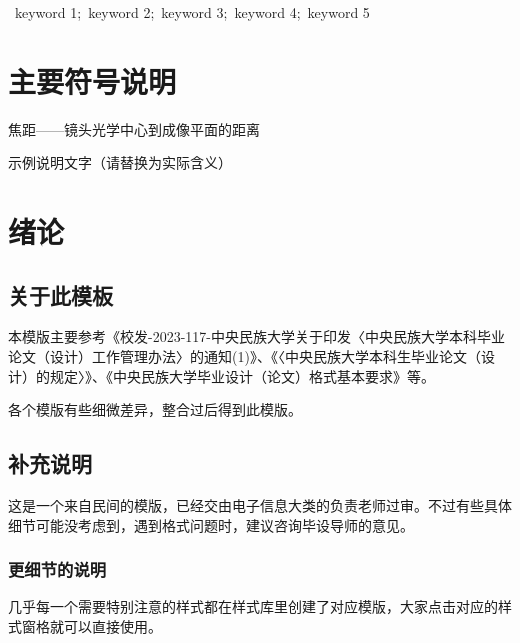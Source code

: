 \documentclass[12pt,a4paper]{ctexart}
\begin{document}
\vspace{1em}
~keyword 1;~keyword 2;~keyword 3;~keyword 4;~keyword 5

\fontfamily{\familydefault}\selectfont 

\newpage
\setcounter{page}{4}
\enlargethispage{\baselineskip}
\vspace*{-\topskip}
\tableofcontents
\thispagestyle{fancy}

\newpage
\listoffigures
\thispagestyle{fancy}

\newpage
\listoftables
\thispagestyle{fancy}

\newpage
\section*{主要符号说明}
\thispagestyle{fancy}
\begin{description}[leftmargin=4em,itemsep=0.5\baselineskip]
    \item[$f$] 焦距——镜头光学中心到成像平面的距离
    \item[$\delta$] 示例说明文字（请替换为实际含义）
\end{description}

\newpage
\setcounter{page}{1}
\section{绪论}
\subsection{关于此模板}
本模版主要参考《校发-2023-117-中央民族大学关于印发〈中央民族大学本科毕业论文（设计）工作管理办法〉的通知(1)》、《〈中央民族大学本科生毕业论文（设计）的规定〉》、《中央民族大学毕业设计（论文）格式基本要求》等。

各个模版有些细微差异，整合过后得到此模版。

\subsection{补充说明}
这是一个来自民间的模版，已经交由电子信息大类的负责老师过审。不过有些具体细节可能没考虑到，遇到格式问题时，建议咨询毕设导师的意见。
\subsubsection{更细节的说明}
几乎每一个需要特别注意的样式都在样式库里创建了对应模版，大家点击对应的样式窗格就可以直接使用。
\end{document}
